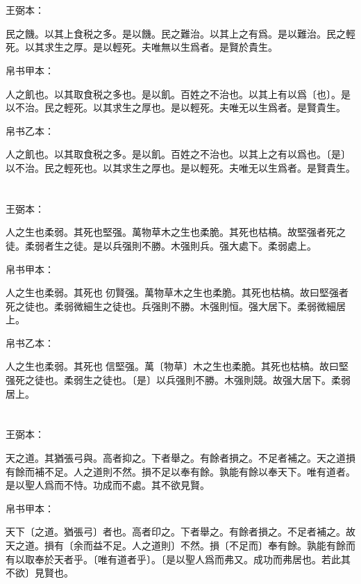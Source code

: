 \documentclass[a5paper]{ctexbook}
\begin{document}
    \chapter{}
    王弼本：

    民之饑。以其上食税之多。是以饑。民之難治。以其上之有爲。是以難治。民之輕死。以其求生之厚。是以輕死。夫唯無以生爲者。是賢於貴生。

    
    帛书甲本：

    人之飢也。以其取食税之多也。是以飢。百姓之不治也。以其上有以爲〔也〕。是以不治。民之輕死。以其求生之厚也。是以輕死。夫唯无以生爲者。是賢貴生。

    帛书乙本：

    人之飢也。以其取食税之多。是以飢。百姓之不治也。以其上之有以爲也。〔是〕以不治。民之輕死也。以其求生之厚也。是以輕死。夫唯无以生爲者。是賢貴生。

    \chapter{}
    王弼本：

    人之生也柔弱。其死也堅强。萬物草木之生也柔脆。其死也枯槁。故堅强者死之徒。柔弱者生之徒。是以兵强則不勝。木强則兵。强大處下。柔弱處上。

    
    帛书甲本：

    人之生也柔弱。其死也𦵕仞賢强。萬物草木之生也柔脆。其死也枯槁。故曰堅强者死之徒也。柔弱微細生之徒也。兵强則不勝。木强則恒。强大居下。柔弱微細居上。

    帛书乙本：

    人之生也柔弱。其死也󱁌信堅强。萬〔物草〕木之生也柔脆。其死也枯槁。故曰堅强死之徒也。柔弱生之徒也。〔是〕以兵强則不勝。木强則競。故强大居下。柔弱居上。

    \chapter{}
    王弼本：

    天之道。其猶張弓與。高者抑之。下者舉之。有餘者損之。不足者補之。天之道損有餘而補不足。人之道則不然。損不足以奉有餘。孰能有餘以奉天下。唯有道者。是以聖人爲而不恃。功成而不處。其不欲見賢。

    
    帛书甲本：

    天下〔之道。猶張弓〕者也。高者印之。下者舉之。有餘者損之。不足者補之。故天之道。損有〔余而益不足。人之道則〕不然。損〔不足而〕奉有餘。孰能有餘而有以取奉於天者乎。〔唯有道者乎〕。〔是以聖人爲而弗又。成功而弗居也。若此其不欲〕見賢也。
\end{document}
